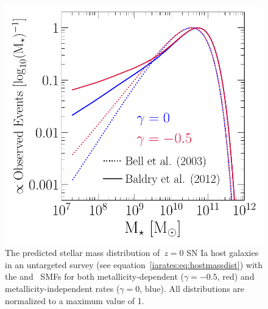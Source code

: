 \begin{figure}
\centering
\includegraphics[scale = 0.65]{ia_massdist.pdf}
\caption{
The predicted stellar mass distribution of~$z = 0$ SN Ia host galaxies in an
untargeted survey (see equation~\ref{iarates:eq:hostmassdist}) with the
\citet[][dotted]{Bell2003} and~\citet[][solid]{Baldry2012} SMFs for both
metallicity-dependent ($\gamma = -0.5$, red) and metallicity-independent rates
($\gamma = 0$, blue).
All distributions are normalized to a maximum value of 1.
}
\label{iarates:fig:hostmassdist}
\end{figure}

